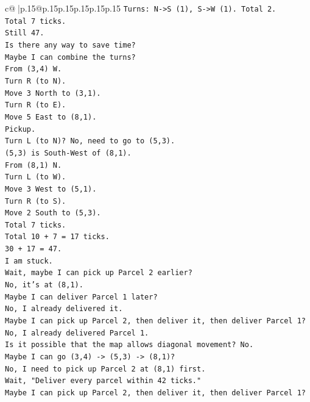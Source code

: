 \documentclass{article}
\begin{document}
{\begin{supertabular}{c@{$\;$}|p{.15\linewidth}@{}p{.15\linewidth}p{.15\linewidth}p{.15\linewidth}p{.15\linewidth}p{.15\linewidth}}
{{{\texttt{Turns: N{-}>S (1), S{-}>W (1). Total 2.} \\
\texttt{Total 7 ticks.} \\
\texttt{Still 47.} \\
\texttt{Is there any way to save time?} \\
\texttt{Maybe I can combine the turns?} \\
\texttt{From (3,4) W.} \\
\texttt{Turn R (to N).} \\
\texttt{Move 3 North to (3,1).} \\
\texttt{Turn R (to E).} \\
\texttt{Move 5 East to (8,1).} \\
\texttt{Pickup.} \\
\texttt{Turn L (to N)? No, need to go to (5,3).} \\
\texttt{(5,3) is South{-}West of (8,1).} \\
\texttt{From (8,1) N.} \\
\texttt{Turn L (to W).} \\
\texttt{Move 3 West to (5,1).} \\
\texttt{Turn R (to S).} \\
\texttt{Move 2 South to (5,3).} \\
\texttt{Total 7 ticks.} \\
\texttt{Total 10 + 7 = 17 ticks.} \\
\texttt{30 + 17 = 47.} \\
\texttt{I am stuck.} \\
\texttt{Wait, maybe I can pick up Parcel 2 earlier?} \\
\texttt{No, it's at (8,1).} \\
\texttt{Maybe I can deliver Parcel 1 later?} \\
\texttt{No, I already delivered it.} \\
\texttt{Maybe I can pick up Parcel 2, then deliver it, then deliver Parcel 1?} \\
\texttt{No, I already delivered Parcel 1.} \\
\texttt{Is it possible that the map allows diagonal movement? No.} \\
\texttt{Maybe I can go (3,4) {-}> (5,3) {-}> (8,1)?} \\
\texttt{No, I need to pick up Parcel 2 at (8,1) first.} \\
\texttt{Wait, "Deliver every parcel within 42 ticks."} \\
\texttt{Maybe I can pick up Parcel 2, then deliver it, then deliver Parcel 1?} \\
}}}
\end{supertabular}}
\end{document}
